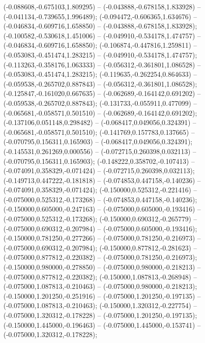  (-0.088608,-0.675103,1.809295) -- (-0.043888,-0.678158,1.833928) -- (-0.041134,-0.739655,1.996489);
 (-0.094472,-0.606365,1.634676) -- (-0.046834,-0.609716,1.658850) -- (-0.043888,-0.678158,1.833928);
 (-0.100582,-0.530618,1.451006) -- (-0.049910,-0.534178,1.474757) -- (-0.046834,-0.609716,1.658850);
 (-0.106874,-0.447816,1.259811) -- (-0.053083,-0.451474,1.283215) -- (-0.049910,-0.534178,1.474757);
 (-0.113263,-0.358176,1.063333) -- (-0.056312,-0.361801,1.086528) -- (-0.053083,-0.451474,1.283215);
 (-0.119635,-0.262254,0.864633) -- (-0.059538,-0.265702,0.887843) -- (-0.056312,-0.361801,1.086528);
 (-0.125847,-0.161020,0.667635) -- (-0.062689,-0.164142,0.691202) -- (-0.059538,-0.265702,0.887843);
 (-0.131733,-0.055911,0.477099) -- (-0.065681,-0.058571,0.501510) -- (-0.062689,-0.164142,0.691202);
 (-0.137106,0.051148,0.298482) -- (-0.068417,0.049056,0.324391) -- (-0.065681,-0.058571,0.501510);
 (-0.141769,0.157783,0.137665) -- (-0.070795,0.156311,0.165903) -- (-0.068417,0.049056,0.324391);
 (-0.145531,0.261269,0.000556) -- (-0.072715,0.260398,0.032113) -- (-0.070795,0.156311,0.165903);
 (-0.148222,0.358702,-0.107413) -- (-0.074091,0.358329,-0.071424) -- (-0.072715,0.260398,0.032113);
 (-0.149713,0.447222,-0.181818) -- (-0.074853,0.447158,-0.140236) -- (-0.074091,0.358329,-0.071424);
 (-0.150000,0.525312,-0.221416) -- (-0.075000,0.525312,-0.173268) -- (-0.074853,0.447158,-0.140236);
 (-0.150000,0.605000,-0.247163) -- (-0.075000,0.605000,-0.193416) -- (-0.075000,0.525312,-0.173268);
 (-0.150000,0.690312,-0.265779) -- (-0.075000,0.690312,-0.207984) -- (-0.075000,0.605000,-0.193416);
 (-0.150000,0.781250,-0.277266) -- (-0.075000,0.781250,-0.216973) -- (-0.075000,0.690312,-0.207984);
 (-0.150000,0.877812,-0.281623) -- (-0.075000,0.877812,-0.220382) -- (-0.075000,0.781250,-0.216973);
 (-0.150000,0.980000,-0.278850) -- (-0.075000,0.980000,-0.218213) -- (-0.075000,0.877812,-0.220382);
 (-0.150000,1.087813,-0.268948) -- (-0.075000,1.087813,-0.210463) -- (-0.075000,0.980000,-0.218213);
 (-0.150000,1.201250,-0.251916) -- (-0.075000,1.201250,-0.197135) -- (-0.075000,1.087813,-0.210463);
 (-0.150000,1.320312,-0.227754) -- (-0.075000,1.320312,-0.178228) -- (-0.075000,1.201250,-0.197135);
 (-0.150000,1.445000,-0.196463) -- (-0.075000,1.445000,-0.153741) -- (-0.075000,1.320312,-0.178228);
